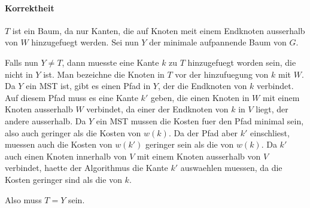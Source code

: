 \paragraph{Korrektheit}
$T$ ist ein Baum, da nur Kanten, die auf Knoten meit einem Endknoten ausserhalb von $W$ hinzugefuegt werden.
Sei nun $Y$ der minimale aufpannende Baum von $G$. 

Falls nun $Y \neq T$, dann muesste eine Kante $k$ zu $T$ hinzugefuegt worden sein, die nicht in $Y$ ist.
Man bezeichne die Knoten in $T$ vor der hinzufuegung von $k$ mit $W$. Da $Y$ ein MST ist, gibt es einen Pfad in $Y$,
der die Endknoten von $k$ verbindet. Auf diesem Pfad muss es eine Kante $k'$ geben, die einen Knoten in $W$ mit einem
Knoten ausserhalb $W$ verbindet, da einer der Endknoten von $k$ in $V$ liegt, der andere ausserhalb.
Da $Y$ ein MST mussen die Kosten fuer den Pfad minimal sein, also auch geringer als die Kosten von $w(k)$.
Da der Pfad aber $k'$ einschliest, muessen auch die Kosten von $w(k')$ geringer sein als die von $w(k)$.
Da $k'$ auch einen Knoten innerhalb von $V$ mit einem Knoten ausserhalb von $V$ verbindet, haette der Algorithmus
die Kante $k'$ auswaehlen muessen, da die Kosten geringer sind als die von $k$.

Also muss $T = Y$ sein.


